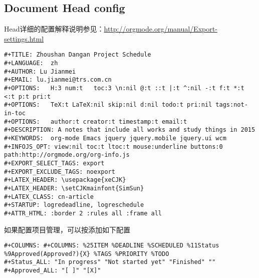 \documentclass[10pt,a4paper]{article}
\begin{document}
\subsection{Document Head config}
\label{sec-1-2}
Head详细的配置解释说明参见：\url{http://orgmode.org/manual/Export-settings.html}
\begin{lstlisting}
#+TITLE: Zhoushan Dangan Project Schedule
#+LANGUAGE:  zh
#+AUTHOR: Lu Jianmei
#+EMAIL: lu.jianmei@trs.com.cn
#+OPTIONS:   H:3 num:t   toc:3 \n:nil @:t ::t |:t ^:nil -:t f:t *:t <:t p:t pri:t
#+OPTIONS:   TeX:t LaTeX:nil skip:nil d:nil todo:t pri:nil tags:not-in-toc
#+OPTIONS:   author:t creator:t timestamp:t email:t
#+DESCRIPTION: A notes that include all works and study things in 2015
#+KEYWORDS:  org-mode Emacs jquery jquery.mobile jquery.ui wcm
#+INFOJS_OPT: view:nil toc:t ltoc:t mouse:underline buttons:0 path:http://orgmode.org/org-info.js
#+EXPORT_SELECT_TAGS: export
#+EXPORT_EXCLUDE_TAGS: noexport
#+LATEX_HEADER: \usepackage{xeCJK}
#+LATEX_HEADER: \setCJKmainfont{SimSun}
#+LATEX_CLASS: cn-article
#+STARTUP: logredeadline, logreschedule
#+ATTR_HTML: :border 2 :rules all :frame all
\end{lstlisting}
如果配置项目管理，可以按添加如下配置
\begin{lstlisting}
#+COLUMNS: #+COLUMNS: %25ITEM %DEADLINE %SCHEDULED %11Status %9Approved(Approved?){X} %TAGS %PRIORITY %TODO
#+Status_ALL: "In progress" "Not started yet" "Finished" ""
#+Approved_ALL: "[ ]" "[X]"
\end{lstlisting}
\end{document}
